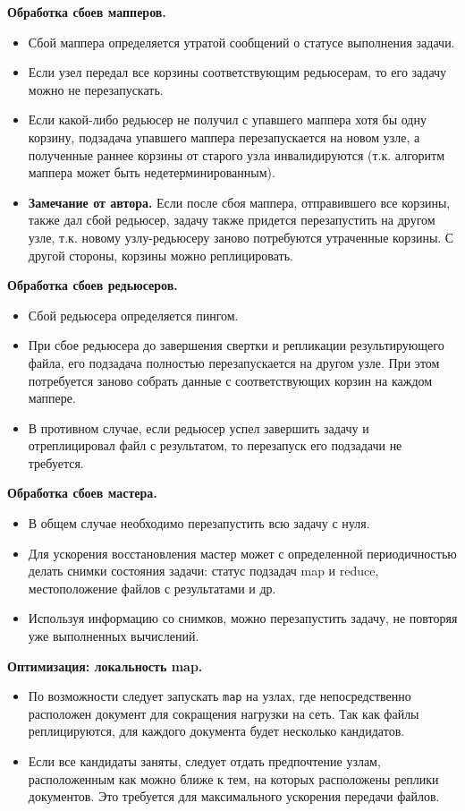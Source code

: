 \textbf{Обработка сбоев мапперов.}
\begin{itemize}
  \item Сбой маппера определяется утратой сообщений о статусе выполнения задачи.
  \item Если узел передал все корзины соответствующим редьюсерам, то его задачу
    можно не перезапускать.
  \item Если какой-либо редьюсер не получил с упавшего маппера хотя бы одну
    корзину, подзадача упавшего маппера перезапускается на новом узле, а полученные раннее корзины
    от старого узла инвалидируются (т.к. алгоритм маппера может быть
    недетерминированным).
  \item  \textbf{Замечание от автора.} Если после сбоя маппера, отправившего все
    корзины, также дал сбой редьюсер, задачу также придется перезапустить на
    другом узле, т.к. новому узлу-редьюсеру заново потребуются утраченные
    корзины. С другой стороны, корзины можно реплицировать.
\end{itemize}

\textbf{Обработка сбоев редьюсеров.}
\begin{itemize}
  \item Сбой редьюсера определяется пингом.
  \item При сбое редьюсера до завершения свертки и репликации результирующего
    файла, его подзадача полностью перезапускается на другом узле. При этом потребуется
    заново собрать данные с соответствующих корзин на каждом маппере.
  \item В противном случае, если редьюсер успел завершить задачу и отреплицировал файл с результатом, то перезапуск его подзадачи не требуется.
\end{itemize}

\textbf{Обработка сбоев мастера.}
\begin{itemize}
  \item В общем случае необходимо перезапустить всю задачу с нуля.
  \item Для ускорения восстановления мастер может с определенной периодичностью делать снимки состояния
    задачи: статус подзадач map и reduce, местоположение файлов с результатами
    и др.
  \item Используя информацию со снимков, можно перезапустить задачу,
    не повторяя уже выполненных вычислений.
\end{itemize}

\textbf{Оптимизация: локальность map.}
\begin{itemize}
  \item По возможности следует запускать \texttt{map} на узлах, где
    непосредственно расположен документ для сокращения нагрузки на сеть. Так как
    файлы реплицируются, для каждого документа будет несколько кандидатов.
  \item Если все кандидаты заняты, следует отдать предпочтение узлам,
    расположенным как можно ближе к тем, на которых расположены реплики
    документов. Это требуется для максимального ускорения передачи файлов.
\end{itemize}

